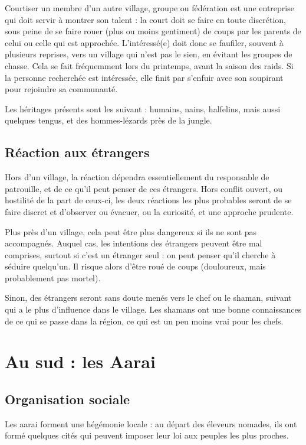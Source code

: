 \documentclass[10pt,a4paper]{book}
\begin{document}
Courtiser un membre d'un autre village, groupe ou fédération est une entreprise qui doit servir à montrer son talent : la court doit se faire en toute discrétion, sous peine de se faire rouer (plus ou moins gentiment) de coups par les parents de celui ou celle qui est approchée. L'intéressé(e) doit donc se faufiler, souvent à plusieurs reprises, vers un village qui n'est pas le sien, en évitant les groupes de chasse. Cela se fait fréquemment lors du printemps, avant la saison des raids. Si la personne recherchée est intéressée, elle finit par s'enfuir avec son soupirant pour rejoindre sa communauté.

Les héritages présents sont les suivant : humains, nains, halfelins, mais aussi quelques tengus, et des hommes-lézards près de la jungle.
\subsection{Réaction aux étrangers}
Hors d'un village, la réaction dépendra essentiellement du responsable de patrouille, et de ce qu'il peut penser de ces étrangers. Hors conflit ouvert, ou hostilité de la part de ceux-ci, les deux réactions les plus probables seront de se faire discret et d'observer ou évacuer, ou la curiosité, et une approche prudente.

Plus près d'un village, cela peut être plus dangereux si ils ne sont pas accompagnés. Auquel cas, les intentions des étrangers peuvent être mal comprises, surtout si c'est un étranger seul : on peut penser qu'il cherche à séduire quelqu'un. Il risque alors d'être roué de coups (douloureux, mais probablement pas mortel).

Sinon, des étrangers seront sans doute menés vers le chef ou le shaman, suivant qui a le plus d'influence dans le village. Les shamans ont une bonne connaissances de ce qui se passe dans la région, ce qui est un peu moins vrai pour les chefs.

\section{Au sud : les Aarai}
\subsection{Organisation sociale}
Les aarai forment une hégémonie locale : au départ des éleveurs nomades, ils ont formé quelques cités qui peuvent imposer leur loi aux peuples les plus proches.
\end{document}
